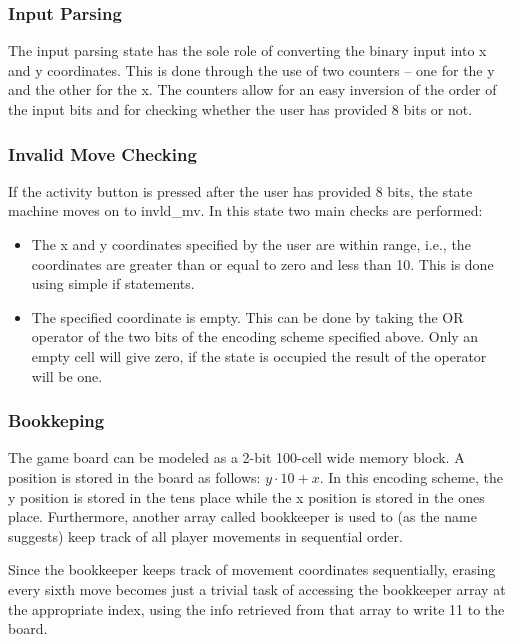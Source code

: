 \documentclass[conference]{IEEEtran}
\begin{document}
   \subsubsection{Input Parsing}
   The input parsing state has the sole role of converting the binary input into x and y coordinates. This is done through the use of two counters – one for the y and the other for the x. The counters allow for an easy inversion of the order of the input bits and for checking whether the user has provided 8 bits or not. \\
\subsubsection{Invalid Move Checking}
If the activity button is pressed after the user has provided 8 bits, the state machine moves on to invld\_mv. In this state two main checks are performed: \begin{itemize} 
\item The x and y coordinates specified by the user are within range, i.e., the coordinates are greater than or equal to zero and less than 10. This is done using simple if statements.
\item The specified coordinate is empty. This can be done by taking the OR operator of the two bits of the encoding scheme specified above. Only an empty cell will give zero, if the state is occupied the result of the operator will be one.
\end{itemize}
\subsubsection{Bookkeping}
The game board can be modeled as a 2-bit 100-cell wide memory block. A position is stored in the board as follows: \(y \cdot 10 + x\). In this encoding scheme, the y position is stored in the tens place while the x position is stored in the ones place. Furthermore, another array called bookkeeper is used to (as the name suggests) keep track of all player movements in sequential order. \\
\par Since the bookkeeper keeps track of movement coordinates sequentially, erasing every sixth move becomes just a trivial task of accessing the bookkeeper array at the appropriate index, using the info retrieved from that array to write 11 to the board. \\
\end{document}
